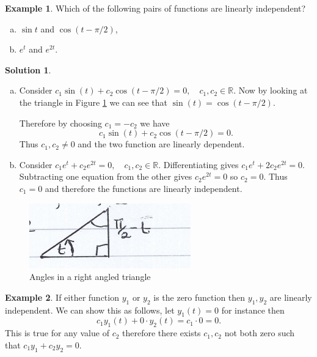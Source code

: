 \documentclass{article}
\theoremstyle{plain}
\theoremstyle{definition}
\newtheorem{exmp}{Example}[section]
\newtheorem*{sol}{Solution}
\numberwithin{equation}{section}
\begin{document}
\begin{tcolorbox}
    \begin{exmp}
        Which of the following pairs of functions are linearly independent?
        \begin{enumerate}[(a)]
            \item $\sin t$ and $\cos(t-\pi/2)$,
            \item $e^t$ and $e^{2t}$.
        \end{enumerate}
    \end{exmp}
    \begin{sol}
        \begin{enumerate}[(a)]
            \item Consider $c_1\sin(t) + c_2 \cos(t-\pi/2) = 0, \quad c_1,c_2 \in \mathbb{R}$. Now by looking at the triangle in Figure \ref{fig:triangle} we can see that $\sin(t) = \cos(t-\pi/2).$

            Therefore by choosing $c_1=-c_2$ we have
            \[
                c_1\sin(t) + c_2 \cos(t-\pi/2) = 0.
            \]
            Thus $c_1,c_2 \neq 0$ and the two function are linearly dependent.
            \item Consider $c_1e^t + c_2e^{2t} = 0, \quad c_1,c_2 \in \mathbb{R}$. Differentiating gives $c_1e^t + 2c_2e^{2t} = 0$. Subtracting one equation from the other gives $c_2e^{2t} = 0$ so $c_2 = 0$. Thus $c_1 = 0$ and therefore the functions are linearly independent.
        \end{enumerate}
    \end{sol}
\end{tcolorbox}

\begin{figure}[htb]
    \centering
    \includegraphics{images/traingle.png}
    \caption{Angles in a right angled triangle}
    \label{fig:triangle}
\end{figure}

\begin{tcolorbox}
\begin{exmp}
    If either function $y_1$ or $y_2$ is the zero function then $y_1,y_2$ are linearly independent. We can show this as follows, let $y_1(t) = 0$ for instance then
    \[
        c_1y_1(t) + 0 \cdot y_2(t) = c_1 \cdot 0 = 0.
    \]
    This is true for any value of $c_2$ therefore there exists $c_1,c_2$ not both zero such that $c_1y_1 + c_2y_2 = 0$.
\end{exmp}
\end{tcolorbox}
\end{document}
